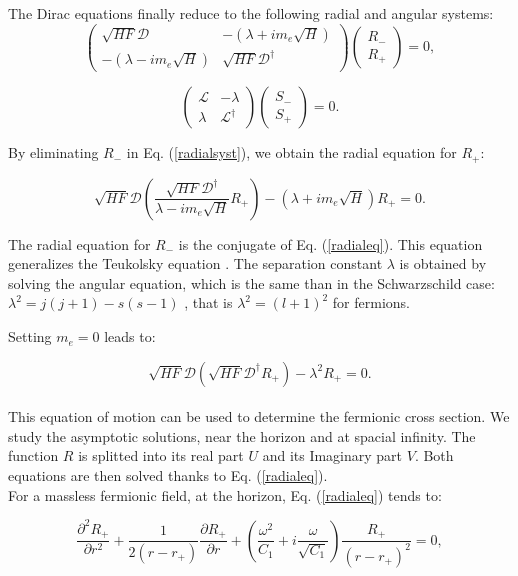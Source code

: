 \documentclass[twocolumn,amsmath,amssymb,prl,10pt,nofootinbib,superscriptaddress]{revtex4}
\def\be{\begin{equation}}
\def\ee{\end{equation}}
\begin{document}
The Dirac equations finally reduce to the following radial and angular systems:
\be 
\begin{pmatrix}
\sqrt{HF}\mathcal{D} &  - (\lambda + i m_e \sqrt{H}) \\
 -(\lambda - i m_e \sqrt{H})  & \sqrt{HF}\mathcal{D}^{\dag} 
\end{pmatrix}
\begin{pmatrix}
R_-\\
R_+
\end{pmatrix}= 0,
\label{radialsyst}
\ee

\be
\begin{pmatrix}
\mathcal{L} &  - \lambda  \\
\lambda   & \mathcal{L}^{\dag} 
\end{pmatrix}
\begin{pmatrix}
S_- \\
S_+
\end{pmatrix}= 0.
\label{angularsyst}
\ee

By eliminating $R_-$ in Eq. (\ref{radialsyst}), we obtain the radial equation for $R_+$:

\be 
\sqrt{HF}\mathcal{D} \left( \frac{\sqrt{HF}\mathcal{D}^{\dag} }{\lambda - i m_e \sqrt{H}} R_+ \right)  - (\lambda + i m_e \sqrt{H}) R_+ = 0.
\label{radialeq}
\ee

\noindent The radial equation for $R_-$ is the conjugate of Eq. (\ref{radialeq}). This equation generalizes the Teukolsky equation \cite{Teukolsky:1973ha}. The separation constant $\lambda$ is obtained by solving the angular equation, which is the same than in the Schwarzschild case: $\lambda^2=j(j+1)-s(s-1)$ \cite{Kanti}, that is $ \lambda^2=(l+1)^2$ for fermions.

Setting $m_e=0$ leads to:

\be 
\sqrt{HF}\mathcal{D} \left( \sqrt{HF}\mathcal{D}^{\dag}  R_+ \right)  - \lambda ^2 R_+ = 0.
\ee\\


This equation of motion can be used to determine the fermionic cross section. We study the asymptotic solutions, near the horizon and at spacial infinity. The function $R$ is splitted into its real part $U$ and its Imaginary part $V$. Both equations are then solved thanks to Eq. (\ref{radialeq}).\\



\noindent For a massless fermionic field, at the horizon, Eq. (\ref{radialeq}) tends to:

\be
\frac{\partial ^2 R_+}{\partial r^2} + \frac{1}{2(r-r_+)}\frac{\partial R_+}{\partial r} + \left( \frac{\omega ^2}{C_1}+ i \frac{\omega}{\sqrt{C_1}} \right) \frac{R_+}{(r-r_+)^2} =0,
\label{radhor}
 \ee
 
\end{document}
